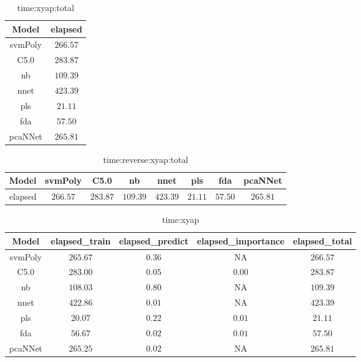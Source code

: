 \begin{table}[!ht]
	\centering
	\begin{tabular}{|c|c|}
		\hline
		Model & elapsed \\ \hline
		svmPoly & $266.57$ \\ \hline
		C5.0 & $283.87$ \\ \hline
		nb & $109.39$ \\ \hline
		nnet & $423.39$ \\ \hline
		pls & $21.11$ \\ \hline
		fda & $57.50$ \\ \hline
		pcaNNet & $265.81$ \\ \hline
	\end{tabular}
	\caption{time:xyap:total}
	\label{tab:time:xyap:total}
\end{table}

\begin{table}[!ht]
	\centering
	\begin{tabular}{|c|c|c|c|c|c|c|c|}
		\hline
		Model & svmPoly & C5.0 & nb & nnet & pls & fda & pcaNNet \\ \hline
		elapsed & $266.57$ & $283.87$ & $109.39$ & $423.39$ & $21.11$ & $57.50$ & $265.81$ \\ \hline
	\end{tabular}
	\caption{time:reverse:xyap:total}
	\label{tab:time:reverse:xyap:total}
\end{table}

\begin{table}[!ht]
	\centering
	\begin{tabular}{|c|c|c|c|c|}
		\hline
		Model & elapsed_train & elapsed_predict & elapsed_importance & elapsed_total \\ \hline
		svmPoly & $265.67$ & $0.36$ & NA & $266.57$ \\ \hline
		C5.0 & $283.00$ & $0.05$ & $0.00$ & $283.87$ \\ \hline
		nb & $108.03$ & $0.80$ & NA & $109.39$ \\ \hline
		nnet & $422.86$ & $0.01$ & NA & $423.39$ \\ \hline
		pls & $20.07$ & $0.22$ & $0.01$ & $21.11$ \\ \hline
		fda & $56.67$ & $0.02$ & $0.01$ & $57.50$ \\ \hline
		pcaNNet & $265.25$ & $0.02$ & NA & $265.81$ \\ \hline
	\end{tabular}
	\caption{time:xyap}
	\label{tab:time:xyap}
\end{table}

